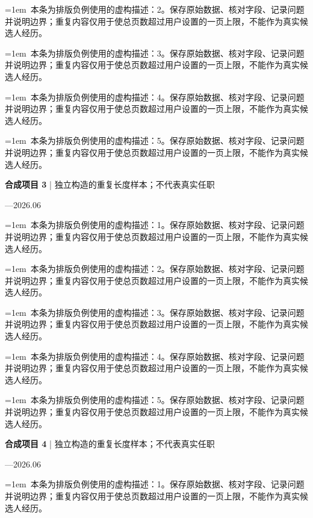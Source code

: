 \documentclass[11pt,a4paper,fontset=fandol]{ctexart}
\begin{document}
\noindent\hangindent=1em\textbullet\ 本条为排版负例使用的虚构描述：2。保存原始数据、核对字段、记录问题并说明边界；重复内容仅用于使总页数超过用户设置的一页上限，不能作为真实候选人经历。\par
\noindent\hangindent=1em\textbullet\ 本条为排版负例使用的虚构描述：3。保存原始数据、核对字段、记录问题并说明边界；重复内容仅用于使总页数超过用户设置的一页上限，不能作为真实候选人经历。\par
\noindent\hangindent=1em\textbullet\ 本条为排版负例使用的虚构描述：4。保存原始数据、核对字段、记录问题并说明边界；重复内容仅用于使总页数超过用户设置的一页上限，不能作为真实候选人经历。\par
\noindent\hangindent=1em\textbullet\ 本条为排版负例使用的虚构描述：5。保存原始数据、核对字段、记录问题并说明边界；重复内容仅用于使总页数超过用户设置的一页上限，不能作为真实候选人经历。\par
\begin{minipage}{\linewidth}
\textbf{合成项目 3} | 独立构造的重复长度样本；不代表真实任职\par
{\small{}—2026.06\par}
\noindent\hangindent=1em\textbullet\ 本条为排版负例使用的虚构描述：1。保存原始数据、核对字段、记录问题并说明边界；重复内容仅用于使总页数超过用户设置的一页上限，不能作为真实候选人经历。\par
\end{minipage}\par
\noindent\hangindent=1em\textbullet\ 本条为排版负例使用的虚构描述：2。保存原始数据、核对字段、记录问题并说明边界；重复内容仅用于使总页数超过用户设置的一页上限，不能作为真实候选人经历。\par
\noindent\hangindent=1em\textbullet\ 本条为排版负例使用的虚构描述：3。保存原始数据、核对字段、记录问题并说明边界；重复内容仅用于使总页数超过用户设置的一页上限，不能作为真实候选人经历。\par
\noindent\hangindent=1em\textbullet\ 本条为排版负例使用的虚构描述：4。保存原始数据、核对字段、记录问题并说明边界；重复内容仅用于使总页数超过用户设置的一页上限，不能作为真实候选人经历。\par
\noindent\hangindent=1em\textbullet\ 本条为排版负例使用的虚构描述：5。保存原始数据、核对字段、记录问题并说明边界；重复内容仅用于使总页数超过用户设置的一页上限，不能作为真实候选人经历。\par
\begin{minipage}{\linewidth}
\textbf{合成项目 4} | 独立构造的重复长度样本；不代表真实任职\par
{\small{}—2026.06\par}
\noindent\hangindent=1em\textbullet\ 本条为排版负例使用的虚构描述：1。保存原始数据、核对字段、记录问题并说明边界；重复内容仅用于使总页数超过用户设置的一页上限，不能作为真实候选人经历。\par
\end{minipage}\par
\end{document}
